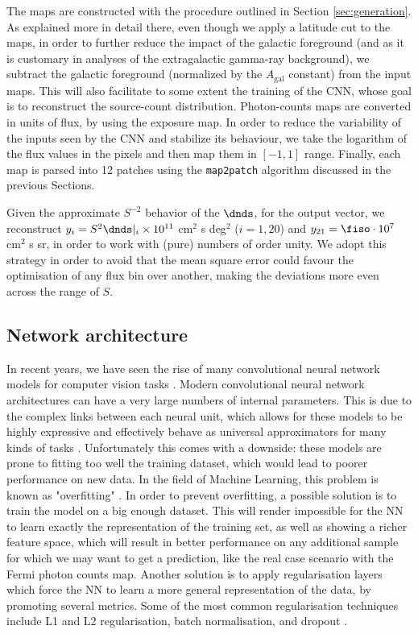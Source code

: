 The maps are constructed with the procedure outlined in Section \ref{sec:generation}. As explained more in detail there, even though we apply a latitude cut to the maps, in order to further reduce the impact of the galactic foreground (and as it is customary in analyses of the extragalactic gamma-ray background), we subtract the galactic foreground (normalized by the $A_\textrm{gal}$ constant) from the input maps. This will also facilitate to some extent the training of the CNN, whose goal is to reconstruct the source-count distribution. Photon-counts maps are converted in units of flux, by using the exposure map. In order to reduce the variability of the inputs seen by the CNN and stabilize its behaviour, we take the logarithm of the flux values in the pixels and then map them in $[-1,1]$ range. 
Finally, each map is parsed into 12 patches using the \verb|map2patch| algorithm discussed in the previous Sections.

Given the approximate $S^{-2}$ behavior of the $\dnds$, for the output vector, we reconstruct $y_i = S^2 \dnds|_i \times 10^{11}$ cm$^{2}$ s deg$^{2}$ ($i=1,20$) and $y_{21}=\fiso \cdot  10^{7}$ cm$^{2}$ s sr, in order to work with (pure) numbers of order unity. We adopt this strategy in order to avoid that the mean square error could favour the optimisation of any flux bin over another, making the deviations more even across the range of $S$.

\subsection{Network architecture}
In recent years, we have seen the rise of many convolutional neural network models for computer vision tasks \cite{CNNreview1, CNNreview2, CNNreview3}.
Modern convolutional neural network architectures can have a very large numbers of internal parameters. This is due to the complex links between each neural unit, which allows for these models to be highly expressive and effectively behave as universal approximators for many kinds of tasks \cite{HORNIK1989359}. Unfortunately this comes with a downside: these models are prone to fitting too well the training dataset, which would lead to poorer performance on new data. In the field of Machine Learning, this problem is known as "overfitting" \cite{overfitting}. In order to prevent overfitting, 
a possible solution is to train the model on a big enough dataset.
This will render impossible for the NN to learn exactly the representation of the training set, as well as showing a richer feature space, which will result in better performance on any additional sample for which we may want to get a prediction, like the real case scenario with the Fermi photon counts map. Another solution is to apply regularisation layers which force the NN to learn a more general representation of the data, by promoting several metrics. Some of the most common regularisation techniques include L1 and L2 regularisation, batch normalisation, and dropout \cite{dropout, batch-normalization, regularisation1, regularisation2}.

